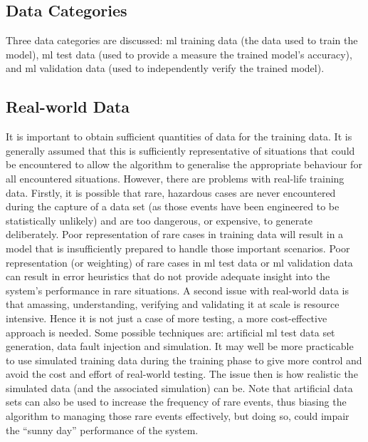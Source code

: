 \subsection{Data Categories}
Three data categories are discussed: \cbstart\gls{ml} training data (the data used to train the model)\cbend,
\gls{ml} test data (used to provide a measure the trained model’s accuracy), and \gls{ml}
validation data (used to independently verify the trained model).  

\subsection{Real-world Data}
It is important to obtain sufficient quantities of data for the training data. It is generally assumed that this is sufficiently representative of situations that could be encountered to allow the algorithm to generalise the appropriate behaviour for all encountered situations.  However, there are problems with real-life training data. Firstly, it is possible that rare, hazardous cases are never encountered during the capture of a data set (as those events have been engineered to be statistically unlikely) and are too dangerous, or expensive, to generate deliberately. Poor representation of rare cases in training data will result in a model that is insufficiently prepared to handle those important scenarios. Poor representation (or weighting) of rare cases in
\gls{ml} test data or \gls{ml}
validation data can result in error heuristics that do not provide adequate insight into the system’s performance in rare situations. A second issue with real-world data is that amassing, understanding, verifying and validating it at scale is resource intensive.
Hence it is not just a case of more testing, a more cost-effective approach is needed. Some possible techniques are: artificial
\gls{ml}
test data set generation, data fault injection and simulation. It may well be more practicable to use simulated training data during the training phase to give more control and avoid the cost and effort of real-world testing. The issue then is how realistic the simulated data (and the associated simulation) can be. Note that artificial data sets can also be used to increase the frequency of rare events, thus biasing the algorithm to managing those rare events effectively, but doing so, could impair the ``sunny day'' performance of the system.

